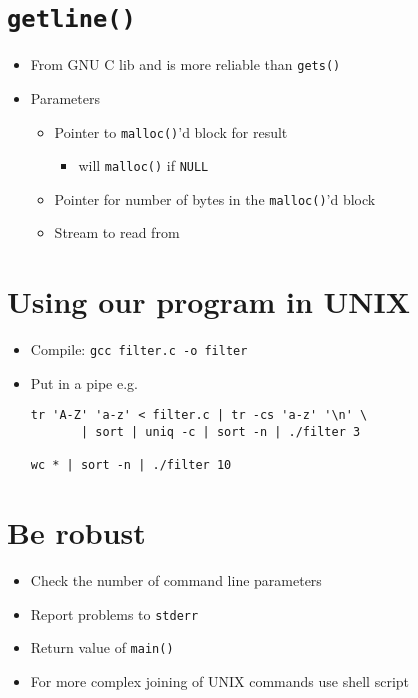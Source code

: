 \documentclass{article}
\begin{document}
\section{\texttt{getline()}}
\begin{itemize}
\item From GNU C lib and is more reliable than \verb!gets()!
\item Parameters
\begin{itemize}
\item Pointer to \verb!malloc()!'d block for result
\begin{itemize}
\item will \verb!malloc()! if \verb!NULL!
\end{itemize}
\item Pointer for number of bytes in the \verb!malloc()!'d block
\item Stream to read from
\end{itemize}
\end{itemize}



\section{Using our program in UNIX}
\begin{itemize}
\item Compile: \verb!gcc filter.c -o filter!
\item Put in a pipe e.g.
\begin{verbatim}
tr 'A-Z' 'a-z' < filter.c | tr -cs 'a-z' '\n' \
       | sort | uniq -c | sort -n | ./filter 3

wc * | sort -n | ./filter 10
\end{verbatim}
\end{itemize}



\section{Be robust}
\begin{itemize}
\item Check the number of command line parameters
\item Report problems to \verb!stderr!
\item Return value of \verb!main()!
\item For more complex joining of UNIX commands use shell script
\end{itemize}
\end{document}
